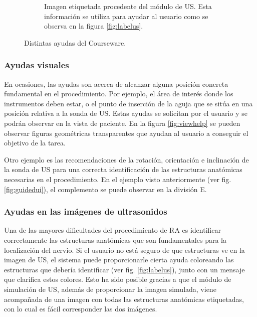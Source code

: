 \begin{figure}[ht]
\begin{subfigure}[b]{0.4\linewidth}
        \caption{Imagen etiquetada procedente del módulo de \acs{US}. Esta información se utiliza para ayudar al usuario como se observa en la figura \ref{fig:labelus}.
    \label{fig:etiquetas}}
    \end{subfigure}
    \caption{Distintas ayudas del \acs{Courseware}.}
   \end{figure}
 
\subsubsection{Ayudas visuales}

En ocasiones, las ayudas son acerca de alcanzar alguna posición concreta fundamental en el procedimiento. Por ejemplo, el área de interés donde los instrumentos deben estar, o el punto de inserción de la aguja que se sitúa en una posición relativa a la sonda de \ac{US}. Estas ayudas se solicitan por el usuario y se podrán observar en la vista de paciente. En la figura \ref{fig:viewhelp} se pueden observar figuras geométricas transparentes que ayudan al usuario a conseguir el objetivo de la tarea.
 
 


Otro ejemplo es las recomendaciones de la rotación, orientación e inclinación de la sonda de \ac{US} para una correcta identificación de las estructuras anatómicas necesarias en el procedimiento. En el ejemplo visto anteriormente (ver fig. \ref{fig:guidedui}), el complemento se puede observar en la división E.


\subsubsection{Ayudas en las imágenes de ultrasonidos}
Una de las mayores dificultades del procedimiento de \ac{RA} es identificar correctamente las estructuras anatómicas que son fundamentales para la localización del nervio. Si el usuario no está seguro de que estructuras ve en la imagen de \ac{US}, el sistema puede proporcionarle cierta ayuda coloreando las estructuras que debería identificar (ver fig. \ref{fig:labelus}), junto con un mensaje que clarifica estos colores. Esto ha sido posible gracias a que el módulo de simulación de \ac{US}, además de proporcionar la imagen simulada, viene acompañada de una imagen con todas las estructuras anatómicas etiquetadas, con lo cual es fácil corresponder las dos imágenes.

